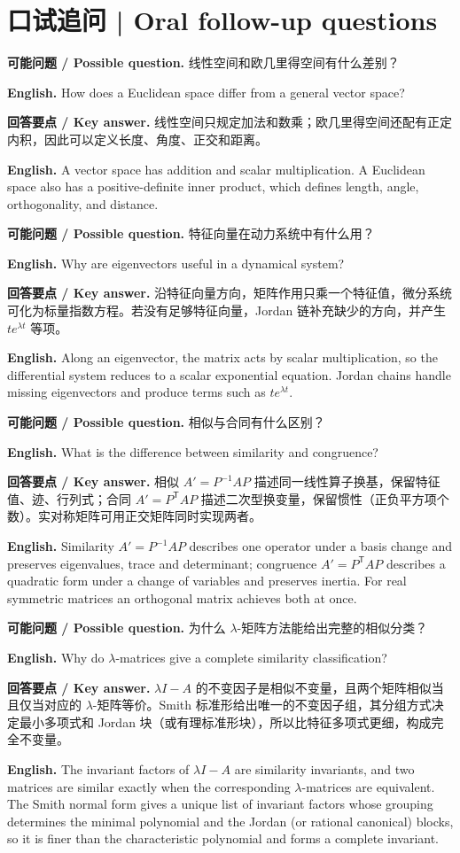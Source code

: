 \documentclass[UTF8,11pt,a4paper]{ctexart}
\newcommand{\EN}[1]{\par\noindent\textbf{English.} #1\par}
\newcommand{\ASK}[4]{\par\noindent\textbf{可能问题 / Possible question.} #1\par\EN{#2}\noindent\textbf{回答要点 / Key answer.} #3\par\EN{#4}\medskip}
\begin{document}
\section*{口试追问 | Oral follow-up questions}
\ASK{线性空间和欧几里得空间有什么差别？}{How does a Euclidean space differ from a general vector space?}{线性空间只规定加法和数乘；欧几里得空间还配有正定内积，因此可以定义长度、角度、正交和距离。}{A vector space has addition and scalar multiplication. A Euclidean space also has a positive-definite inner product, which defines length, angle, orthogonality, and distance.}
\ASK{特征向量在动力系统中有什么用？}{Why are eigenvectors useful in a dynamical system?}{沿特征向量方向，矩阵作用只乘一个特征值，微分系统可化为标量指数方程。若没有足够特征向量，Jordan 链补充缺少的方向，并产生 $t e^{\lambda t}$ 等项。}{Along an eigenvector, the matrix acts by scalar multiplication, so the differential system reduces to a scalar exponential equation. Jordan chains handle missing eigenvectors and produce terms such as $t e^{\lambda t}$.}
\ASK{相似与合同有什么区别？}{What is the difference between similarity and congruence?}{相似 $A'=P^{-1}AP$ 描述同一线性算子换基，保留特征值、迹、行列式；合同 $A'=P^{\mathsf T}AP$ 描述二次型换变量，保留惯性（正负平方项个数）。实对称矩阵可用正交矩阵同时实现两者。}{Similarity $A'=P^{-1}AP$ describes one operator under a basis change and preserves eigenvalues, trace and determinant; congruence $A'=P^{\mathsf T}AP$ describes a quadratic form under a change of variables and preserves inertia. For real symmetric matrices an orthogonal matrix achieves both at once.}
\ASK{为什么 $\lambda$-矩阵方法能给出完整的相似分类？}{Why do $\lambda$-matrices give a complete similarity classification?}{$\lambda I-A$ 的不变因子是相似不变量，且两个矩阵相似当且仅当对应的 $\lambda$-矩阵等价。Smith 标准形给出唯一的不变因子组，其分组方式决定最小多项式和 Jordan 块（或有理标准形块），所以比特征多项式更细，构成完全不变量。}{The invariant factors of $\lambda I-A$ are similarity invariants, and two matrices are similar exactly when the corresponding $\lambda$-matrices are equivalent. The Smith normal form gives a unique list of invariant factors whose grouping determines the minimal polynomial and the Jordan (or rational canonical) blocks, so it is finer than the characteristic polynomial and forms a complete invariant.}
\end{document}
